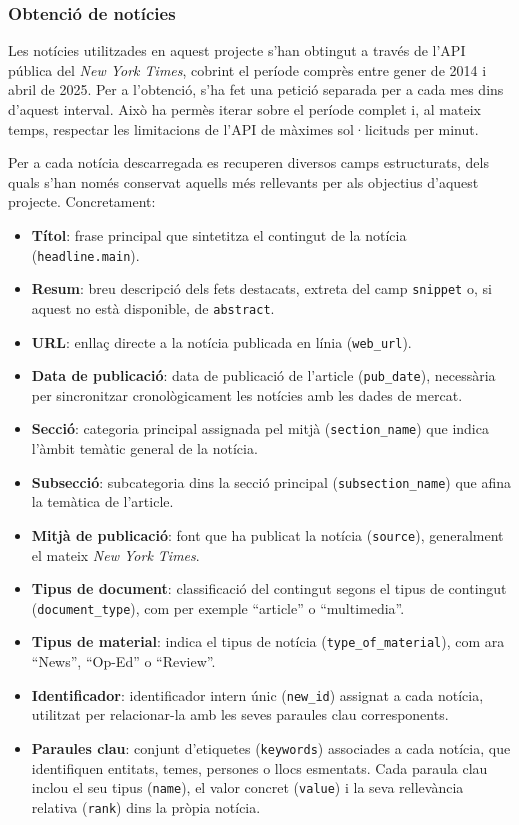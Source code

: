 \documentclass[12pt,a4paper,twoside]{book}
\begin{document}
\subsubsection{Obtenció de notícies}

Les notícies utilitzades en aquest projecte s'han obtingut a través de l'API pública del \textit{New York Times}, cobrint el període comprès entre gener de 2014 i abril de 2025. Per  a l'obtenció, s'ha fet una petició separada per a cada mes dins d'aquest interval. Això ha permès iterar sobre el període complet i, al mateix temps, respectar les limitacions de l'API de màximes sol·licituds per minut.

Per a cada notícia descarregada es recuperen diversos camps estructurats, dels quals s'han només conservat aquells més rellevants per als objectius d'aquest projecte. Concretament:

\begin{itemize}
    \item \textbf{Títol}: frase principal que sintetitza el contingut de la notícia (\texttt{headline.main}).
    \item \textbf{Resum}: breu descripció dels fets destacats, extreta del camp \texttt{snippet} o, si aquest no està disponible, de \texttt{abstract}.
    \item \textbf{URL}: enllaç directe a la notícia publicada en línia (\texttt{web\_url}).
    \item \textbf{Data de publicació}: data de publicació de l'article (\texttt{pub\_date}), necessària per sincronitzar cronològicament les notícies amb les dades de mercat.
    \item \textbf{Secció}: categoria principal assignada pel mitjà (\texttt{section\_name}) que indica l'àmbit temàtic general de la notícia.
    \item \textbf{Subsecció}: subcategoria dins la secció principal (\texttt{subsection\_name}) que afina la temàtica de l'article.
    \item \textbf{Mitjà de publicació}: font que ha publicat la notícia (\texttt{source}), generalment el mateix \textit{New York Times}.
    \item \textbf{Tipus de document}: classificació del contingut segons el tipus de contingut (\texttt{document\_type}), com per exemple “article” o “multimedia”.
    \item \textbf{Tipus de material}: indica el tipus de notícia (\texttt{type\_of\_material}), com ara “News”, “Op-Ed” o “Review”.
    \item \textbf{Identificador}: identificador intern únic (\texttt{new\_id}) assignat a cada notícia, utilitzat per relacionar-la amb les seves paraules clau corresponents.
    \item \textbf{Paraules clau}: conjunt d'etiquetes (\texttt{keywords}) associades a cada notícia, que identifiquen entitats, temes, persones o llocs esmentats. Cada paraula clau inclou el seu tipus (\texttt{name}), el valor concret (\texttt{value}) i la seva rellevància relativa (\texttt{rank}) dins la pròpia notícia.
\end{itemize}
\end{document}
